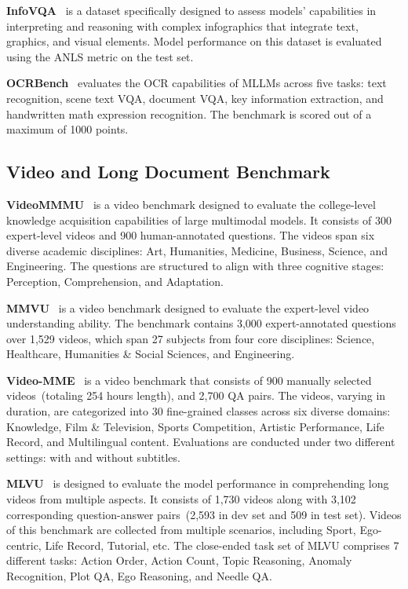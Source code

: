 \documentclass{article}
\newcommand{\citep}[1]{\parencite{#1}}
\begin{document}
\textbf{InfoVQA}~\citep{mathew2022infographicvqa} is a dataset specifically designed to assess models' capabilities in interpreting and reasoning with complex infographics that integrate text, graphics, and visual elements. Model performance on this dataset is evaluated using the ANLS metric on the test set.

\textbf{OCRBench}~\citep{liu2023hidden} evaluates the OCR capabilities of MLLMs across five tasks: text recognition, scene text VQA, document VQA, key information extraction, and handwritten math expression recognition. The benchmark is scored out of a maximum of 1000 points.

\subsection{Video and Long Document Benchmark}
\textbf{VideoMMMU}~\citep{arxiv2025videommmu} is a video benchmark designed to evaluate the college-level knowledge acquisition capabilities of large multimodal models. It consists of 300 expert-level videos and 900 human-annotated questions. The videos span six diverse academic disciplines: Art, Humanities, Medicine, Business, Science, and Engineering. The questions are structured to align with three cognitive stages: Perception, Comprehension, and Adaptation.

\textbf{MMVU}~\citep{arxiv2025mmvu} is a video benchmark designed to evaluate the expert-level video understanding ability. The benchmark contains 3,000 expert-annotated questions over 1,529 videos, which span 27 subjects from four core disciplines: Science, Healthcare, Humanities \& Social Sciences, and Engineering.

\textbf{Video-MME}~\citep{arxiv2024videomme} is a video benchmark that consists of 900 manually selected videos~(totaling 254 hours length), and 2,700 QA pairs. The videos, varying in duration, are categorized into 30 fine-grained classes across six diverse domains: Knowledge, Film \& Television, Sports Competition, Artistic Performance, Life Record, and Multilingual content. Evaluations are conducted under two different settings: with and without subtitles.

\textbf{MLVU}~\citep{arxiv2024mlvu} is designed to evaluate the model performance in comprehending long videos from multiple aspects. It consists of 1,730 videos along with 3,102 corresponding question-answer pairs~(2,593 in dev set and 509 in test set). Videos of this benchmark are collected from multiple scenarios, including Sport, Ego-centric, Life Record, Tutorial, etc. The close-ended task set of MLVU comprises 7 different tasks: Action Order, Action Count, Topic Reasoning, Anomaly Recognition, Plot QA, Ego Reasoning, and Needle QA.
\end{document}
